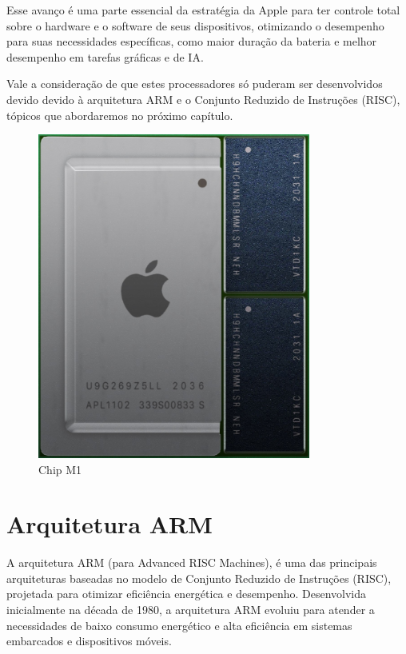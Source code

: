 \documentclass[a4paper,times,12pt]{article}
\begin{document}
Esse avanço é uma parte essencial da estratégia da Apple para ter controle total sobre o hardware e o software de seus dispositivos, otimizando o desempenho para suas necessidades específicas, como maior duração da bateria e melhor desempenho em tarefas gráficas e de IA. 

Vale a consideração de que estes processadores só puderam ser desenvolvidos devido devido à arquitetura ARM e o Conjunto Reduzido de Instruções (RISC), tópicos que abordaremos no próximo capítulo.

\begin{figure}[ht]
    \centering
    \includegraphics[width=0.8\textwidth]{./apple.jpeg}
    \caption{Chip M1}
    \label{fig:apple_m1}
\end{figure}


\section{Arquitetura ARM}
\hspace{+15pt}
A arquitetura ARM (para Advanced RISC Machines), é uma das principais arquiteturas baseadas no modelo de Conjunto Reduzido de Instruções (RISC), projetada para otimizar eficiência energética e desempenho. Desenvolvida inicialmente na década de 1980, a arquitetura ARM evoluiu para atender a necessidades de baixo consumo energético e alta eficiência em sistemas embarcados e dispositivos móveis.
\end{document}
